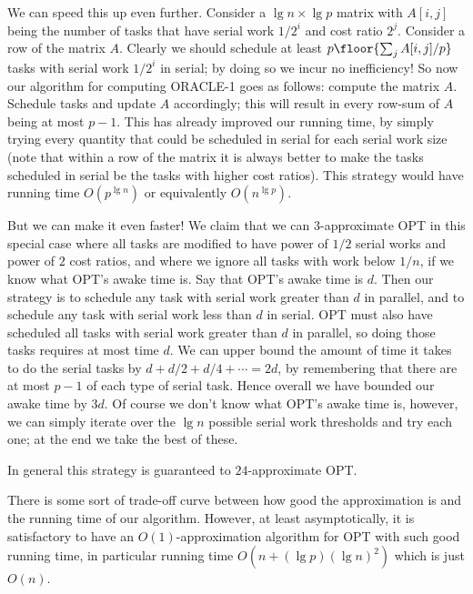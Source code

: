 We can speed this up even further.
Consider a $\lg n \times \lg p$ matrix with $A[i,j]$ being the number of tasks that
have serial work $1/2^i$ and cost ratio $2^j$.
Consider a row of the matrix $A$. Clearly we should schedule at
least $p \floor{\sum_j A[i, j]/p}$ tasks with serial work $1/2^i$ in
serial; by doing so we incur no inefficiency! 
So now our algorithm for computing ORACLE-1 goes as follows:
compute the matrix $A$. Schedule tasks and update $A$
accordingly; this will result in every row-sum of $A$ being at
most $p-1$.
This has already improved our running time, by simply trying
every quantity that could be scheduled in serial for each serial
work size (note that within a row of the matrix it is always
better to make the tasks scheduled in serial be the tasks with
higher cost ratios). This strategy would have running time
$O(p^{\lg n})$ or equivalently $O(n^{\lg p})$.

But we can make it even faster!
We claim that we can $3$-approximate OPT in this special case
where all tasks are modified to have power of $1/2$ serial works
and power of $2$ cost ratios, and where we ignore all tasks with
work below $1/n$, if we know what OPT's awake time is.
Say that OPT's awake time is $d$. Then our strategy is to
schedule any task with serial work greater than $d$ in parallel,
and to schedule any task with serial work less than $d$ in
serial. OPT must also have scheduled all tasks with serial work
greater than $d$ in parallel, so doing those tasks requires at
most time $d$. We can upper bound the amount of time it takes to
do the serial tasks by $d + d/2 + d/4 + \cdots = 2d$, by
remembering that there are at most $p-1$ of each type of serial
task. Hence overall we have bounded our awake time by $3d$.
Of course we don't know what OPT's awake time is, however, we can
simply iterate over the $\lg n$ possible serial work thresholds and
try each one; at the end we take the best of these.

In general this strategy is guaranteed to $24$-approximate OPT.

There is some sort of trade-off curve between how good the
approximation is and the running time of our algorithm.
However, at least asymptotically, it is satisfactory to have an
$O(1)$-approximation algorithm for OPT with such good running
time, in particular running time $O(n + (\lg p)(\lg n)^2)$ which is
just $O(n)$.


